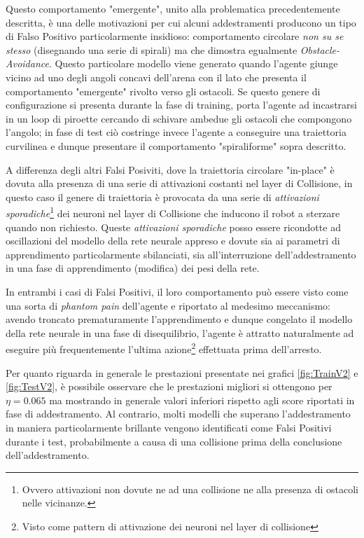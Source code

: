 Questo comportamento "emergente", unito alla problematica precedentemente descritta, è una delle motivazioni per cui alcuni addestramenti producono un tipo di Falso Positivo particolarmente insidioso: comportamento circolare \textit{non su se stesso} (disegnando una serie di spirali) ma che dimostra egualmente \textit{Obstacle-Avoidance}. Questo particolare modello viene generato quando l'agente giunge vicino ad uno degli angoli concavi dell'arena con il lato che presenta il comportamento "emergente" rivolto verso gli ostacoli. Se questo genere di configurazione si presenta durante la fase di training, porta l'agente ad incastrarsi in un loop di piroette cercando di schivare ambedue gli ostacoli che compongono l'angolo; in fase di test ciò costringe invece l'agente a conseguire una traiettoria curvilinea e dunque presentare il comportamento "spiraliforme" sopra descritto.

A differenza degli altri Falsi Posiviti, dove la traiettoria circolare "in-place" è dovuta alla presenza di una serie di attivazioni costanti nel layer di Collisione, in questo caso il genere di traiettoria è provocata da una serie di \textit{attivazioni sporadiche}\footnote{Ovvero attivazioni non dovute ne ad una collisione ne alla presenza di ostacoli nelle vicinanze.} dei neuroni nel layer di Collisione che inducono il robot a sterzare quando non richiesto. Queste \textit{attivazioni sporadiche} posso essere ricondotte ad oscillazioni del modello della rete neurale appreso e dovute sia ai parametri di apprendimento particolarmente sbilanciati, sia all'interruzione dell'addestramento in una fase di apprendimento (modifica) dei pesi della rete. 

In entrambi i casi di Falsi Positivi, il loro comportamento può essere visto come una sorta di \textit{phantom pain} dell'agente e riportato al medesimo meccanismo: avendo troncato prematuramente l'apprendimento e dunque congelato il modello della rete neurale in una fase di disequilibrio, l'agente è attratto naturalmente ad eseguire più frequentemente l'ultima azione\footnote{Visto come pattern di attivazione dei neuroni nel layer di collisione} effettuata prima dell'arresto.

Per quanto riguarda in generale le prestazioni presentate nei grafici \ref{fig:TrainV2} e \ref{fig:TestV2}, è possibile osservare che le prestazioni migliori si ottengono per $\eta=0.065$ ma mostrando in generale valori inferiori rispetto agli score riportati in fase di addestramento. Al contrario, molti modelli che superano l'addestramento in maniera particolarmente brillante vengono identificati come Falsi Positivi durante i test, probabilmente a causa di una collisione prima della conclusione dell'addestramento.


